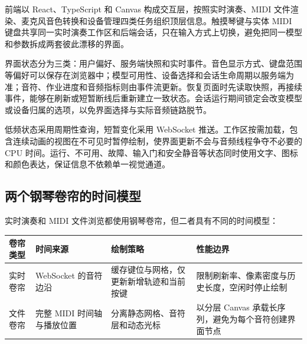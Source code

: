 前端以 React、TypeScript 和 Canvas 构成交互层，按照实时演奏、MIDI
文件渲染、麦克风音色转换和设备管理四类任务组织顶层信息。触摸琴键与实体
MIDI
键盘共享同一实时演奏工作区和后端会话，只在输入方式上切换，避免把同一模型和参数拆成两套彼此漂移的界面。

界面状态分为三类：用户偏好、服务端快照和实时事件。音色显示方式、键盘范围等偏好可以保存在浏览器中；模型可用性、设备选择和会话生命周期以服务端为准；音符、作业进度和音频指标则由事件流更新。恢复页面时先读取快照，再接续事件，能够在刷新或短暂断线后重新建立一致状态。会话运行期间锁定会改变模型或设备归属的选项，以免界面选择与实际音频链路脱节。

低频状态采用周期性查询，短暂变化采用 WebSocket
推送。工作区按需加载，包含连续动画的视图在不可见时暂停绘制，使界面更新不会与音频线程争夺不必要的
CPU
时间。运行、不可用、故障、输入门和安全静音等状态同时使用文字、图标和颜色表达，保证信息不依赖单一视觉通道。

\subsection{两个钢琴卷帘的时间模型}\label{src-experiment-case3-canvas}

实时演奏和 MIDI 文件浏览都使用钢琴卷帘，但二者具有不同的时间模型：

\begin{longtable}[]{@{}
  >{\raggedright\arraybackslash}p{}
  >{\raggedright\arraybackslash}p{}
  >{\raggedright\arraybackslash}p{}
  >{\raggedright\arraybackslash}p{}@{}}
\toprule\noalign{}
\begin{minipage}[b]{\linewidth}\raggedright
卷帘类型
\end{minipage} & \begin{minipage}[b]{\linewidth}\raggedright
时间来源
\end{minipage} & \begin{minipage}[b]{\linewidth}\raggedright
绘制策略
\end{minipage} & \begin{minipage}[b]{\linewidth}\raggedright
性能边界
\end{minipage} \\
\midrule\noalign{}
\endhead
\bottomrule\noalign{}
\endlastfoot
实时卷帘 & WebSocket 的音符边沿 &
缓存键位与网格，仅更新新增轨迹和当前按键 &
限制刷新率、像素密度与历史长度，空闲时停止绘制 \\
文件卷帘 & 完整 MIDI 时间轴与播放位置 & 分离静态网格、音符层和动态光标 &
以分层 Canvas 承载长序列，避免为每个音符创建界面节点 \\
\end{longtable}

